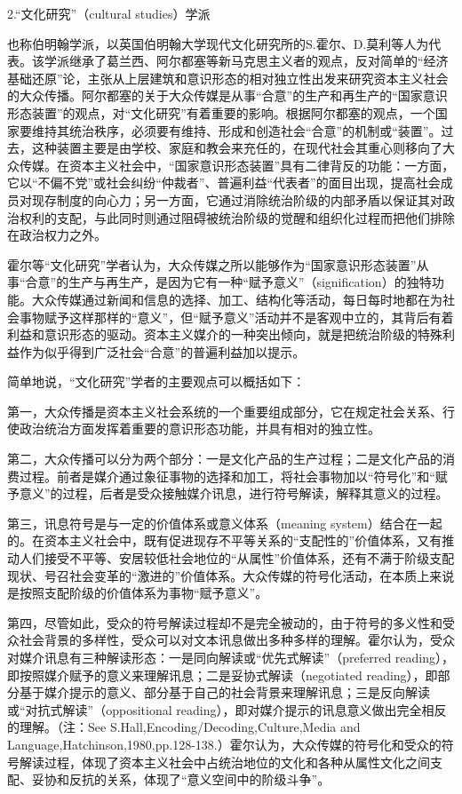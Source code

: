 \documentclass[UTF8,12pt]{ctexart}
\numberwithin{equation}{section} %
\numberwithin{figure}{section}
\numberwithin{table}{section}
\begin{document}
	2.“文化研究”（cultural studies）学派
	
	也称伯明翰学派，以英国伯明翰大学现代文化研究所的S.霍尔、D.莫利等人为代表。该学派继承了葛兰西、阿尔都塞等新马克思主义者的观点，反对简单的“经济基础还原”论，主张从上层建筑和意识形态的相对独立性出发来研究资本主义社会的大众传播。阿尔都塞的关于大众传媒是从事“合意”的生产和再生产的“国家意识形态装置”的观点，对“文化研究”有着重要的影响。根据阿尔都塞的观点，一个国家要维持其统治秩序，必须要有维持、形成和创造社会“合意”的机制或“装置”。过去，这种装置主要是由学校、家庭和教会来充任的，在现代社会其重心则移向了大众传媒。在资本主义社会中，“国家意识形态装置”具有二律背反的功能：一方面，它以“不偏不党”或社会纠纷“仲裁者”、普遍利益“代表者”的面目出现，提高社会成员对现存制度的向心力；另一方面，它通过消除统治阶级的内部矛盾以保证其对政治权利的支配，与此同时则通过阻碍被统治阶级的觉醒和组织化过程而把他们排除在政治权力之外。
	
	霍尔等“文化研究”学者认为，大众传媒之所以能够作为“国家意识形态装置”从事“合意”的生产与再生产，是因为它有一种“赋予意义”（signification）的独特功能。大众传媒通过新闻和信息的选择、加工、结构化等活动，每日每时地都在为社会事物赋予这样那样的“意义”，但“赋予意义”活动并不是客观中立的，其背后有着利益和意识形态的驱动。资本主义媒介的一种突出倾向，就是把统治阶级的特殊利益作为似乎得到广泛社会“合意”的普遍利益加以提示。
	
	简单地说，“文化研究”学者的主要观点可以概括如下：
	
	第一，大众传播是资本主义社会系统的一个重要组成部分，它在规定社会关系、行使政治统治方面发挥着重要的意识形态功能，并具有相对的独立性。
	
	第二，大众传播可以分为两个部分：一是文化产品的生产过程；二是文化产品的消费过程。前者是媒介通过象征事物的选择和加工，将社会事物加以“符号化”和“赋予意义”的过程，后者是受众接触媒介讯息，进行符号解读，解释其意义的过程。
	
	第三，讯息符号是与一定的价值体系或意义体系（meaning system）结合在一起的。在资本主义社会中，既有促进现存不平等关系的“支配性的”价值体系，又有推动人们接受不平等、安居较低社会地位的“从属性”价值体系，还有不满于阶级支配现状、号召社会变革的“激进的”价值体系。大众传媒的符号化活动，在本质上来说是按照支配阶级的价值体系为事物“赋予意义”。
	
	第四，尽管如此，受众的符号解读过程却不是完全被动的，由于符号的多义性和受众社会背景的多样性，受众可以对文本讯息做出多种多样的理解。霍尔认为，受众对媒介讯息有三种解读形态：一是同向解读或“优先式解读”（preferred reading），即按照媒介赋予的意义来理解讯息；二是妥协式解读（negotiated reading），即部分基于媒介提示的意义、部分基于自己的社会背景来理解讯息；三是反向解读或“对抗式解读”（oppositional reading），即对媒介提示的讯息意义做出完全相反的理解。（注：See S.Hall,Encoding/Decoding,Culture,Media and Language,Hatchinson,1980,pp.128-138.）霍尔认为，大众传媒的符号化和受众的符号解读过程，体现了资本主义社会中占统治地位的文化和各种从属性文化之间支配、妥协和反抗的关系，体现了“意义空间中的阶级斗争”。
	
\end{document}
